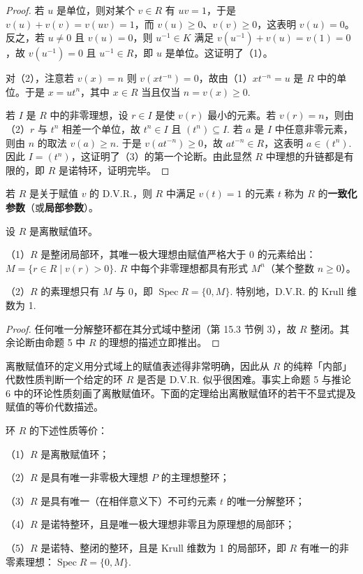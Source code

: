 \begin{proof}
若 \(u\) 是单位，则对某个 \(v \in R\) 有 \(uv = 1\)，于是 \(v(u)+v(v) = v(uv) = 1\)，而 \(v(u) \geq 0\)、\(v(v) \geq 0\)，这表明 \(v(u) = 0\)。反之，若 \(u \neq 0\) 且 \(v(u) = 0\)，则 \(u^{-1} \in K\) 满足 \(v(u^{-1})+v(u) = v(1) = 0\)，故 \(v(u^{-1}) = 0\) 且 \(u^{-1} \in R\)，即 \(u\) 是单位。这证明了（1）。

对（2），注意若 \(v(x) = n\) 则 \(v(xt^{-n}) = 0\)，故由（1）\(xt^{-n} = u\) 是 \(R\) 中的单位。于是 \(x = ut^n\)，其中 \(x \in R\) 当且仅当 \(n = v(x) \geq 0\).

若 \(I\) 是 \(R\) 中的非零理想，设 \(r \in I\) 是使 \(v(r)\) 最小的元素。若 \(v(r) = n\)，则由（2）\(r\) 与 \(t^n\) 相差一个单位，故 \(t^n \in I\) 且 \((t^n) \subseteq I\). 若 \(a\) 是 \(I\) 中任意非零元素，则由 \(n\) 的取法 \(v(a) \geq n\). 于是 \(v(at^{-n}) \geq 0\)，故 \(at^{-n} \in R\)，这表明 \(a \in (t^n)\). 因此 \(I = (t^n)\)，这证明了（3）的第一个论断。由此显然 \(R\) 中理想的升链都是有限的，即 \(R\) 是诺特环，证明完毕。
\end{proof}

\begin{definition}
若 \(R\) 是关于赋值 \(v\) 的 D.V.R.，则 \(R\) 中满足 \(v(t) = 1\) 的元素 \(t\) 称为 \(R\) 的\textbf{一致化参数}（或\textbf{局部参数}）。
\end{definition}

\begin{corollary}\label{cor:16.6}
设 \(R\) 是离散赋值环。

（1）\(R\) 是整闭局部环，其唯一极大理想由赋值严格大于 0 的元素给出：\(M = \{r \in R \mid v(r) > 0\}\). \(R\) 中每个非零理想都具有形式 \(M^n\)（某个整数 \(n \geq 0\)）。

（2）\(R\) 的素理想只有 \(M\) 与 \(0\)，即 \(\operatorname{Spec}R = \{0, M\}\). 特别地，D.V.R. 的 Krull 维数为 1.
\end{corollary}

\begin{proof}
任何唯一分解整环都在其分式域中整闭（第 15.3 节例 3），故 \(R\) 整闭。其余论断由命题 5 中 \(R\) 的理想的描述立即推出。
\end{proof}

离散赋值环的定义用分式域上的赋值表述得非常明确，因此从 \(R\) 的纯粹「内部」代数性质判断一个给定的环 \(R\) 是否是 D.V.R. 似乎很困难。事实上命题 5 与推论 6 中的环论性质刻画了离散赋值环。下面的定理给出离散赋值环的若干不显式提及赋值的等价代数描述。

\begin{theorem}\label{thm:16.7}
环 \(R\) 的下述性质等价：

（1）\(R\) 是离散赋值环；

（2）\(R\) 是具有唯一非零极大理想 \(P\) 的主理想整环；

（3）\(R\) 是具有唯一（在相伴意义下）不可约元素 \(t\) 的唯一分解整环；

（4）\(R\) 是诺特整环，且是唯一极大理想非零且为原理想的局部环；

（5）\(R\) 是诺特、整闭的整环，且是 Krull 维数为 1 的局部环，即 \(R\) 有唯一的非零素理想：\(\operatorname{Spec}R = \{0, M\}\).
\end{theorem}


